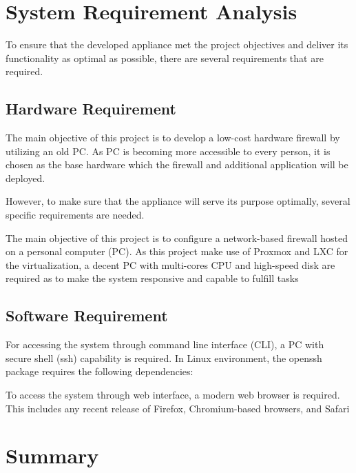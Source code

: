 \documentclass[../index.tex]{subfiles}
\begin{document}
\section{System Requirement Analysis}

To ensure that the developed appliance met the project objectives and deliver its functionality as
optimal as possible, there are several requirements that are required.

\subsection{Hardware Requirement}

The main objective of this project is to develop a low-cost hardware firewall by utilizing an old
PC. As PC is becoming more accessible to every person, it is chosen as the base hardware which the
firewall and additional application will be deployed.

However, to make sure that the appliance will serve its purpose optimally, several specific
requirements are needed.

The main objective of this project is to configure a network-based firewall hosted on a personal
computer (PC). As this project make use of Proxmox and LXC for the virtualization, a decent PC with
multi-cores CPU and high-speed disk are required as to make the system responsive and capable to
fulfill tasks

\subsection{Software Requirement}

For accessing the system through command line interface (CLI), a PC with secure shell (ssh)
capability is required. In Linux environment, the openssh package requires the following
dependencies:

To access the system through web interface, a modern web browser is required. This includes any
recent release of Firefox, Chromium-based browsers, and Safari

\section{Summary}
\end{document}
